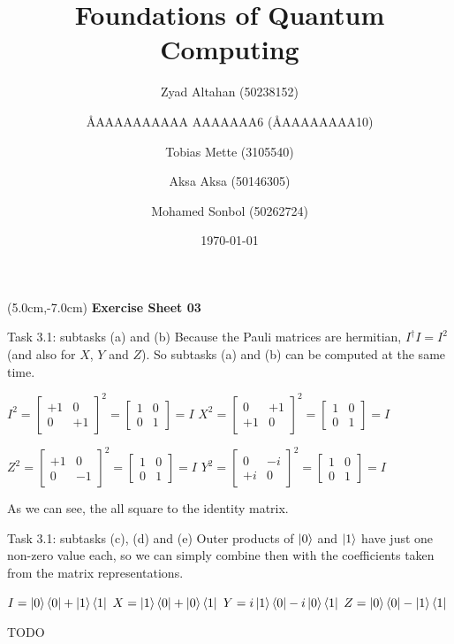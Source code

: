 \documentclass[aspectratio=169]{beamer}
\title{Foundations of Quantum Computing}
\author[]{Zyad Altahan (50238152) \and \AA{AAAAAAAAAA AAAAAAA}{6} (\AA{AAAAAAAA}{10}) \and Tobias Mette (3105540) \and Aksa Aksa (50146305) \and Mohamed Sonbol (50262724)}
\institute[]{Department of Computer Science \\ University of Bonn}
\date{\today}
\begin{document}
\begin{frame}
    \titlepage
    \begin{textblock*}{8cm}(5.0cm,-7.0cm)
        {\large \color{uwopurple}\hspace{0.66cm} \textbf{Exercise Sheet 03}} %
    \end{textblock*}
\end{frame}


\begin{frame}[fragile]{Task 3.1: subtasks (a) and (b)}
Because the Pauli matrices are hermitian, $I^\dagger I = I^2$ (and also for $X$, $Y$ and $Z$). So subtasks (a) and (b) can be computed at the same time.

$I^2 = \begin{bmatrix}+1 & 0 \\ 0 & +1 \end{bmatrix}^2 = \begin{bmatrix}1 & 0 \\ 0 & 1 \end{bmatrix} = I$
\hfill
$X^2 = \begin{bmatrix}0 & +1 \\ +1 & 0 \end{bmatrix}^2 = \begin{bmatrix}1 & 0 \\ 0 & 1 \end{bmatrix} = I$

$Z^2 = \begin{bmatrix}+1 & 0 \\ 0 & -1 \end{bmatrix}^2 = \begin{bmatrix}1 & 0 \\ 0 & 1 \end{bmatrix} = I$
\hfill
$Y^2 = \begin{bmatrix}0 & -i \\ +i & 0 \end{bmatrix}^2 = \begin{bmatrix}1 & 0 \\ 0 & 1 \end{bmatrix} = I$

As we can see, the all square to the identity matrix.
\end{frame}


\begin{frame}[fragile]{Task 3.1: subtasks (c), (d) and (e)}
Outer products of $\ket{0}$ and $\ket{1}$ have just one non-zero value each, so we can simply combine then with the coefficients taken from the matrix representations.

$I = \ket{0}\bra{0} + \ket{1}\bra{1}$ \hfill
$X = \ket{1}\bra{0} + \ket{0}\bra{1}$ \hfill
$Y = i\ket{1}\bra{0} - i\ket{0}\bra{1}$ \hfill
$Z = \ket{0}\bra{0} - \ket{1}\bra{1}$

TODO


\end{frame}
\end{document}
